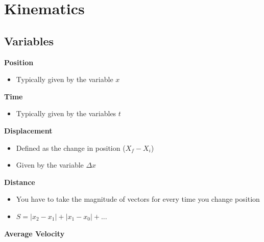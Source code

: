 \documentclass[
  letterpaper,
  DIV=11,
  numbers=noendperiod]{scrartcl}
\author{}
\date{}
\providecommand{\tightlist}{%
  \setlength{\itemsep}{0pt}\setlength{\parskip}{0pt}}\usepackage{longtable,booktabs,array}
\renewcommand*\contentsname{Table of contents}
\newcommand\contentsname{Table of contents}
\begin{document}

\newpage

\ifdefined\Shaded\renewenvironment{Shaded}{\begin{tcolorbox}[boxrule=0pt, enhanced, interior hidden, borderline west={3pt}{0pt}{shadecolor}, breakable, sharp corners, frame hidden]}{\end{tcolorbox}}\fi

\renewcommand*\contentsname{Table of Contents}
{
\hypersetup{linkcolor=}
\setcounter{tocdepth}{4}
\tableofcontents
}
\newpage{}

\hypertarget{kinematics}{%
\section{Kinematics}\label{kinematics}}

\hypertarget{variables}{%
\subsection{Variables}\label{variables}}

\textbf{Position}

\begin{itemize}
\tightlist
\item
  Typically given by the variable \(x\)
\end{itemize}

\textbf{Time}

\begin{itemize}
\tightlist
\item
  Typically given by the variables \(t\)
\end{itemize}

\textbf{Displacement}

\begin{itemize}
\tightlist
\item
  Defined as the change in position (\(X_f - X_i\))
\item
  Given by the variable \(\Delta x\)
\end{itemize}

\textbf{Distance}

\begin{itemize}
\tightlist
\item
  You have to take the magnitude of vectors for every time you change
  position
\item
  \(S = |x_2 - x_1| + |x_1 - x_0| + ...\)
\end{itemize}

\textbf{Average Velocity}
\end{document}
